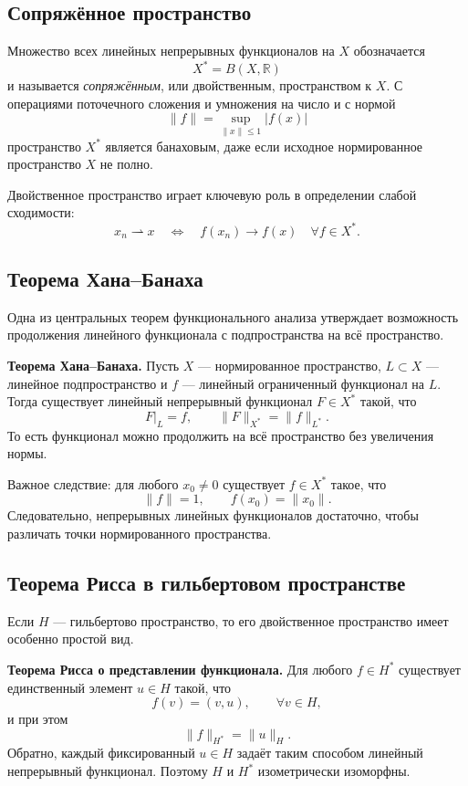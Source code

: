 \subsection{Сопряжённое пространство}

Множество всех линейных непрерывных функционалов на $X$ обозначается
\[
    X^*=B(X,\mathbb R)
\]
и называется \emph{сопряжённым}, или двойственным, пространством к $X$.
С операциями поточечного сложения и умножения на число и с нормой
\[
    \|f\|=\sup_{\|x\|\leq1}|f(x)|
\]
пространство $X^*$ является банаховым, даже если исходное нормированное
пространство $X$ не полно.

Двойственное пространство играет ключевую роль в определении слабой сходимости:
\[
    x_n\rightharpoonup x
    \quad\Longleftrightarrow\quad
    f(x_n)\to f(x)\quad\forall f\in X^*.
\]

\subsection{Теорема Хана--Банаха}

Одна из центральных теорем функционального анализа утверждает возможность
продолжения линейного функционала с подпространства на всё пространство.

\textbf{Теорема Хана--Банаха.}
Пусть $X$ --- нормированное пространство, $L\subset X$ --- линейное
подпространство и $f$ --- линейный ограниченный функционал на $L$. Тогда
существует линейный непрерывный функционал $F\in X^*$ такой, что
\[
    F|_L=f,
    \qquad
    \|F\|_{X^*}=\|f\|_{L^*}.
\]
То есть функционал можно продолжить на всё пространство без увеличения нормы.

Важное следствие: для любого $x_0\neq0$ существует $f\in X^*$ такое, что
\[
    \|f\|=1,
    \qquad
    f(x_0)=\|x_0\|.
\]
Следовательно, непрерывных линейных функционалов достаточно, чтобы различать
точки нормированного пространства.

\subsection{Теорема Рисса в гильбертовом пространстве}

Если $H$ --- гильбертово пространство, то его двойственное пространство имеет
особенно простой вид.

\textbf{Теорема Рисса о представлении функционала.}
Для любого $f\in H^*$ существует единственный элемент $u\in H$ такой, что
\[
    f(v)=(v,u),
    \qquad \forall v\in H,
\]
и при этом
\[
    \|f\|_{H^*}=\|u\|_H.
\]
Обратно, каждый фиксированный $u\in H$ задаёт таким способом линейный
непрерывный функционал. Поэтому $H$ и $H^*$ изометрически изоморфны.

